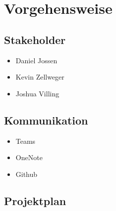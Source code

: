 \section{Vorgehensweise}

\subsection{Stakeholder}
\begin{itemize}
    \item Daniel Jossen
    \item Kevin Zellweger
    \item Joshua Villing
\end{itemize}
\subsection{Kommunikation}
\begin{itemize}
    \item Teams
    \item OneNote
    \item Github
\end{itemize}
\subsection{Projektplan}